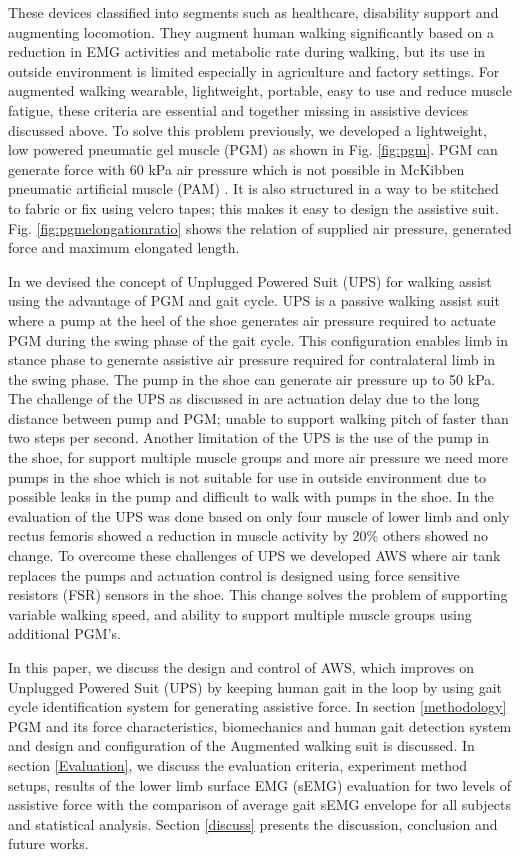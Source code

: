 \documentclass[letterpaper, 10 pt, conference]{ieeeconf}  %
\begin{document}
These devices classified into segments such as healthcare, disability support and augmenting locomotion. They augment human walking significantly based on a reduction in EMG activities and metabolic rate during walking, but its use in outside environment is limited especially in agriculture and factory settings. For augmented walking wearable, lightweight, portable, easy to use and reduce muscle fatigue, these criteria are essential and together missing in assistive devices discussed above. To solve this problem previously, we developed a lightweight, low powered pneumatic gel muscle (PGM) \cite{14} as shown in Fig. \ref{fig:pgm}. PGM can generate force with 60 kPa air pressure which is not possible in McKibben pneumatic artificial muscle (PAM) \cite{15}. It is also structured in a way to be stitched to fabric or fix using velcro tapes; this makes it easy to design the assistive suit. Fig. \ref{fig:pgmelongationratio} shows the relation of supplied air pressure, generated force and maximum elongated length.

In \cite{16} we devised the concept of Unplugged Powered Suit (UPS) for walking assist using the advantage of PGM and gait cycle. UPS is a passive walking assist suit where a pump at the heel of the shoe generates air pressure required to actuate PGM during the swing phase of the gait cycle. This configuration enables limb in stance phase to generate assistive air pressure required for contralateral limb in the swing phase. The pump in the shoe can generate air pressure up to 50 kPa. The challenge of the UPS as discussed in \cite{16} are actuation delay due to the long distance between pump and PGM; unable to support walking pitch of faster than two steps per second. Another limitation of the UPS is the use of the pump in the shoe, for support multiple muscle groups and more air pressure we need more pumps in the shoe which is not suitable for use in outside environment due to possible leaks in the pump and difficult to walk with pumps in the shoe. In the \cite{16} evaluation of the UPS was done based on only four muscle of lower limb and only rectus femoris showed a reduction in muscle activity by 20\% others showed no change. To overcome these challenges of UPS we developed AWS where air tank replaces the pumps and actuation control is designed using force sensitive resistors (FSR) sensors in the shoe. This change solves the problem of supporting variable walking speed, and ability to support multiple muscle groups using additional PGM’s.

In this paper, we discuss the design and control of AWS, which improves on Unplugged Powered Suit (UPS) by keeping human gait in the loop by using gait cycle identification system for generating assistive force. In section \ref{methodology} PGM and its force characteristics, biomechanics and human gait detection system and design and configuration of the Augmented walking suit is discussed. In section \ref{Evaluation}, we discuss the evaluation criteria, experiment method setups, results of the lower limb surface EMG (sEMG) evaluation for two levels of assistive force with the comparison of average gait sEMG envelope for all subjects and statistical analysis. Section \ref{discuss} presents the discussion, conclusion and future works.
\end{document}
